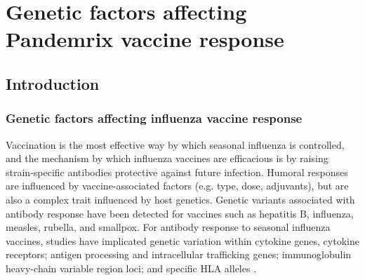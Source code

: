 %
%

\chapter{Genetic factors affecting Pandemrix vaccine response}
\label{chap:hird_reQTL}

\section{Introduction}

\subsection{Genetic factors affecting influenza vaccine response}

Vaccination is the most effective way by which seasonal influenza is controlled\autocite{houser2015InfluenzaVaccinesChallenges},
and the mechanism by which influenza vaccines are efficacious is by raising strain-specific antibodies protective against future infection\autocite{nauta2009RelationshipMeanAntibody}.
Humoral responses are influenced by vaccine-associated factors (e.g. type, dose, adjuvants), 
but are also a complex trait influenced by host genetics\autocite{linnik2016ImpactHostGenetic, mentzer2015SearchingHumanGenetic}.
Genetic variants associated with antibody response have been detected for vaccines such as hepatitis B, influenza, measles, rubella, and smallpox\autocite{linnik2016ImpactHostGenetic,dhakal2019HostFactorsImpact}.
For antibody response to seasonal influenza vaccines, studies have implicated 
genetic variation within cytokine genes, cytokine receptors\autocite{poland2008ImmunogeneticsSeasonalInfluenza};
antigen processing and intracellular trafficking genes\autocite{franco2013IntegrativeGenomicAnalysis}; 
immunoglobulin heavy-chain variable region loci\autocite{avnir2016IGHV169PolymorphismModulates};
and specific \gls{HLA} alleles \autocite{poland2008ImmunogeneticsSeasonalInfluenza,moss2013CorrelationHumanLeukocyte}.

